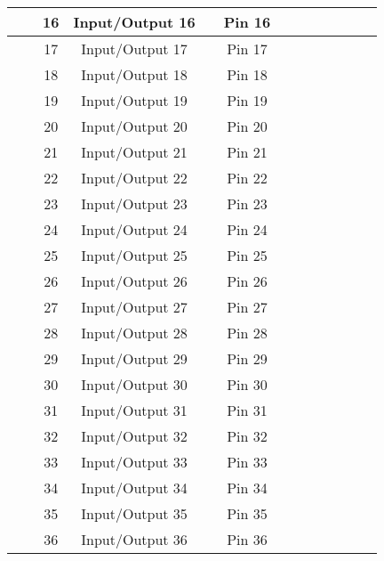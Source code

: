 \documentclass[10pt,a4paper,landscape]{article}
\begin{document}
\begin{table}[t]
{\begin{tabular}{|ccc|c|c|c|c|c|c|c|c|c|c|}
\hline
 &  & \multicolumn{1}{|c|}{16} & Input/Output 16 & & Pin 16 & & & & & & & \\
\hline
 &  & \multicolumn{1}{|c|}{17} & Input/Output 17 & & Pin 17 & & & & & & & \\
\hline
 &  & \multicolumn{1}{|c|}{18} & Input/Output 18 & & Pin 18 & & & & & & & \\
\hline
 &  & \multicolumn{1}{|c|}{19} & Input/Output 19 & & Pin 19 & & & & & & & \\
\hline
 &  & \multicolumn{1}{|c|}{20} & Input/Output 20 & & Pin 20 & & & & & & & \\
\hline
 &  & \multicolumn{1}{|c|}{21} & Input/Output 21 & & Pin 21 & & & & & & & \\
\hline
 &  & \multicolumn{1}{|c|}{22} & Input/Output 22 & & Pin 22 & & & & & & & \\
\hline
 &  & \multicolumn{1}{|c|}{23} & Input/Output 23 & & Pin 23 & & & & & & & \\
\hline
 &  & \multicolumn{1}{|c|}{24} & Input/Output 24 & & Pin 24 & & & & & & & \\
\hline
 &  & \multicolumn{1}{|c|}{25} & Input/Output 25 & & Pin 25 & & & & & & & \\
\hline
 &  & \multicolumn{1}{|c|}{26} & Input/Output 26 & & Pin 26 & & & & & & & \\
\hline
 &  & \multicolumn{1}{|c|}{27} & Input/Output 27 & & Pin 27 & & & & & & & \\
\hline
 &  & \multicolumn{1}{|c|}{28} & Input/Output 28 & & Pin 28 & & & & & & & \\
\hline
 &  & \multicolumn{1}{|c|}{29} & Input/Output 29 & & Pin 29 & & & & & & & \\
\hline
 &  & \multicolumn{1}{|c|}{30} & Input/Output 30 & & Pin 30 & & & & & & & \\
\hline
 &  & \multicolumn{1}{|c|}{31} & Input/Output 31 & & Pin 31 & & & & & & & \\
\hline
 &  & \multicolumn{1}{|c|}{32} & Input/Output 32 & & Pin 32 & & & & & & & \\
\hline
 &  & \multicolumn{1}{|c|}{33} & Input/Output 33 & & Pin 33 & & & & & & & \\
\hline
 &  & \multicolumn{1}{|c|}{34} & Input/Output 34 & & Pin 34 & & & & & & & \\
\hline
 &  & \multicolumn{1}{|c|}{35} & Input/Output 35 & & Pin 35 & & & & & & & \\
\hline
 &  & \multicolumn{1}{|c|}{36} & Input/Output 36 & & Pin 36 & & & & & & & \\

\end{tabular}}
\end{table}
\end{document}
